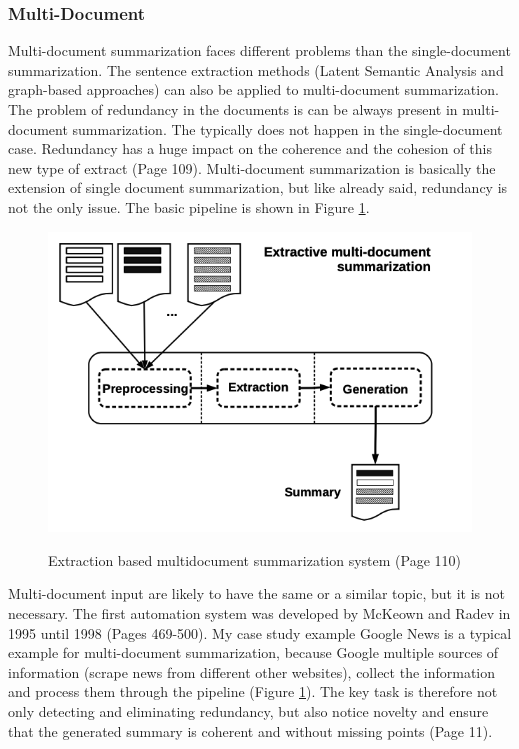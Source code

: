 \subsubsection{Multi-Document}\label{ss:multi}

Multi-document summarization faces different problems than the single-document summarization. The sentence extraction methods (Latent Semantic Analysis and graph-based approaches) can also be applied to multi-document summarization. The problem of redundancy in the documents is can be always present in multi-document summarization. The typically does not happen in the single-document case. Redundancy has a huge impact on the coherence and the cohesion of this new type of extract \cite{juan} (Page 109). Multi-document summarization is basically the extension of single document summarization, but like already said, redundancy is not the only issue. The basic pipeline is shown in Figure \ref{multi}. 

\begin{figure}
	\begin{center}
		\includegraphics[width=4.5in]{photos/multidoc}\\
		\caption{Extraction based multidocument summarization system \cite{juan} (Page 110)}\label{multi}
	\end{center}
\end{figure}

Multi-document input are likely to have the same or a similar topic, but it is not necessary. The first automation system was developed by McKeown and Radev in 1995 until 1998 \cite{radev-mckeown-1998-generating} (Pages 469-500). My case study example Google News is a typical example for multi-document summarization, because Google multiple sources of information (scrape news from different other websites), collect the information and process them through the pipeline (Figure \ref{multi}). The key task is therefore not only detecting and eliminating redundancy, but also notice novelty and ensure that the generated summary is coherent and without missing points \cite{Das07asurvey} (Page 11).
 
